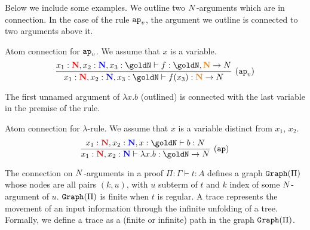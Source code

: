 Below we include some examples. 
We outline two ${N}$-arguments which are in connection. 
In the case of the rule $\apvar$, the argument we outline is 
connected to two arguments above it.


\begin{Eg}\label{eg:3}%
Atom connection for $\apvar$.
We assume that $x$ is a variable.
\[
\infer[(\apvar)]{
  x_1 : \bfColor{red}{\N},{x_2} : \bfColor{blue}{\N}, x_3  : \goldN
  \prove f(x_3) : \bfColor{orange}{\N} \rightarrow \N
}{
  x_1 : \bfColor{red}{\N},{x_2} : \bfColor{blue}{\N}, x_3  : \goldN
  \prove f : \goldN, \bfColor{orange}{\N} \rightarrow \N
}
\]
\end{Eg}

The first unnamed argument of $\lambda x.b$ (outlined)
is connected with the last variable in the premise of the rule.


\begin{Eg}\label{eg:4}%
Atom connection for  $\lambda$-rule.
We assume that $x$ is  a variable distinct from $x_1$, $x_2$.
\[
\infer[(\ap)]{
  x_1: \bfColor{red}{\N}, x_2: \bfColor{blue}{\N}
  \prove \lambda x.b : \goldN \rightarrow \N
}{
  x_1: \bfColor{red}{\N}, x_2: \bfColor{blue}{\N}, x:\goldN \prove b : \N
}
\]
\end{Eg}




The connection on ${N}$-arguments in a proof $\Pi:\Gamma\vdash t:A$ defines a 
graph ${\tt Graph}(\Pi)$ whose nodes are all pairs $(k,u)$, with $u$ subterm of $t$ and 
$k$ index of some ${N}$-argument of  $u$. ${\tt Graph}(\Pi)$ is finite when $t$ is 
regular. A trace represents the movement of an input information through the 
infinite unfolding of a tree. Formally, we define a trace as a (finite or infinite) path 
in the graph ${\tt Graph}(\Pi)$.


